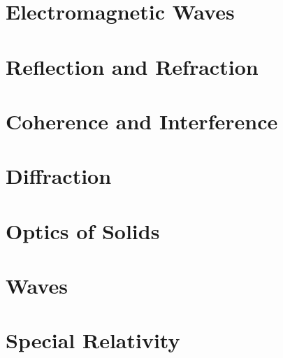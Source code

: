\documentclass{book}
\begin{document}
\chapter{Electromagnetic Waves}

\chapter{Reflection and Refraction}

\chapter{Coherence and Interference}

\chapter{Diffraction}

\chapter{Optics of Solids}

\begin{comment}
\part{Relativistic Electrodynamics}
\end{comment}
\appendix
\begin{comment}
\chapter{Electric Circuits}
\section{Electronics}
\section{DC Current}
\section{AC Current}
\chapter{Magnetic Circuits}
\end{comment}
\chapter{Waves}

\chapter{Special Relativity}

\nocite{griffem,jackson,landau2,zangwillem,fowles,fourieropt}
\printbibliography
\end{document}
